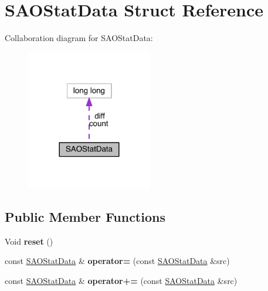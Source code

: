 \hypertarget{struct_s_a_o_stat_data}{}\section{S\+A\+O\+Stat\+Data Struct Reference}
\label{struct_s_a_o_stat_data}


Collaboration diagram for S\+A\+O\+Stat\+Data\+:
\nopagebreak
\begin{figure}[H]
\begin{center}
\leavevmode
\includegraphics[width=156pt]{d6/df4/struct_s_a_o_stat_data__coll__graph}
\end{center}
\end{figure}
\subsection*{Public Member Functions}
\begin{DoxyCompactItemize}
\item 
\mbox{\label{struct_s_a_o_stat_data_a4417252babf954782c461b00aa2b52cb}} 
Void {\bfseries reset} ()
\item 
\mbox{\label{struct_s_a_o_stat_data_add4285a945715d83984e4520117c3a40}} 
const \hyperlink{struct_s_a_o_stat_data}{S\+A\+O\+Stat\+Data} \& {\bfseries operator=} (const \hyperlink{struct_s_a_o_stat_data}{S\+A\+O\+Stat\+Data} \&src)
\item 
\mbox{\label{struct_s_a_o_stat_data_a4e72b4b413d572ead8128a11ddcc529d}} 
const \hyperlink{struct_s_a_o_stat_data}{S\+A\+O\+Stat\+Data} \& {\bfseries operator+=} (const \hyperlink{struct_s_a_o_stat_data}{S\+A\+O\+Stat\+Data} \&src)
\end{DoxyCompactItemize}
